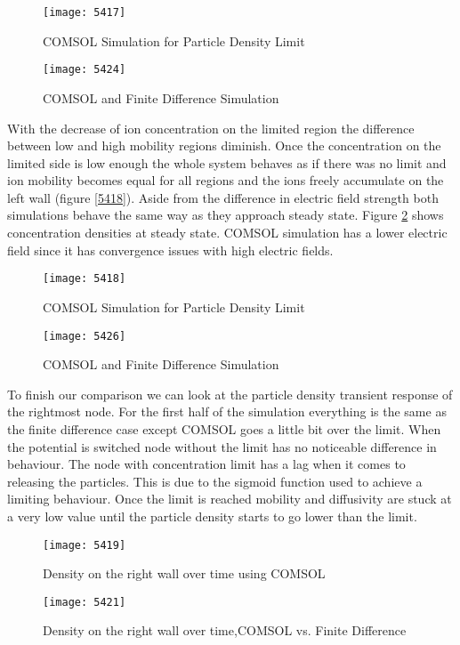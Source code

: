 \begin{figure}[ht]
\centering
\begin{minipage}[b]{0.45\linewidth}
\texttt{[image: 5417]}
\caption{COMSOL Simulation for Particle Density Limit}
\label{5417}
\end{minipage}
\quad
\begin{minipage}[b]{0.45\linewidth}
\texttt{[image: 5424]}
\caption{COMSOL and Finite Difference Simulation}
\label{5424}
\end{minipage}
\end{figure}

With the decrease of ion concentration on the limited region the difference between low and high mobility regions diminish. Once the concentration on the limited side is low enough the whole system behaves as if there was no limit and ion mobility becomes equal for all regions and the ions freely accumulate on the left wall (figure \ref{5418}). Aside from the difference in electric field strength both simulations behave the same way as they approach steady state. Figure \ref{5426} shows concentration densities at steady state. COMSOL simulation has a lower electric field since it has convergence issues with high electric fields. 

\begin{figure}[ht]
\centering
\begin{minipage}[b]{0.45\linewidth}
\texttt{[image: 5418]}
\caption{COMSOL Simulation for Particle Density Limit}
\label{5418}
\end{minipage}
\quad
\begin{minipage}[b]{0.45\linewidth}
\texttt{[image: 5426]}
\caption{COMSOL and Finite Difference Simulation}
\label{5426}
\end{minipage}
\end{figure}

To finish our comparison we can look at the particle density transient response of the rightmost node. For the first half of the simulation everything is the same as the finite difference case except COMSOL goes a little bit over the limit. When the potential is switched node without the limit has no noticeable difference in behaviour. The node with concentration limit has a lag when it comes to releasing the particles. This is due to the sigmoid function used to achieve a limiting behaviour. Once the limit is reached mobility and diffusivity are stuck at a very low value until the particle density starts to go lower than the limit.
\begin{figure}[ht]
\centering
\begin{minipage}[b]{0.45\linewidth}
\texttt{[image: 5419]}
\caption{Density on the right wall over time using COMSOL}
\label{5419}
\end{minipage}
\quad
\begin{minipage}[b]{0.45\linewidth}
\texttt{[image: 5421]}
\caption{Density on the right wall over time,COMSOL vs. Finite Difference}
\label{5421}
\end{minipage}
\end{figure}

